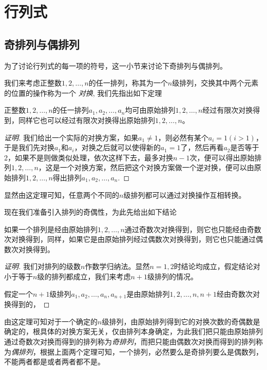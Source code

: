 
\section{行列式}
\label{sec:determinant}

\subsection{奇排列与偶排列}
\label{sec:odd-permutation-and-even-permutation}

为了讨论行列式的每一项的符号，这一小节来讨论下奇排列与偶排列。

我们来考虑正整数$1,2,\ldots,n$的任一排列，称其为一个$n$级排列，交换其中两个元素的位置的操作称为一个 \emph{对换}, 我们先指出如下定理
\begin{theorem}
  \label{theorem:all-rangement-can-be-producted-by-exchange}
  正整数$1,2,\ldots,n$的任一排列$a_1,a_2,\ldots,a_n$均可由原始排列$1,2,\ldots,n$经过有限次对换得到，同样它也可以经过有限次对换得出原始排列$1,2,\ldots,n$。
\end{theorem}

\begin{proof}[证明]
  我们给出一个实际的对换方案，如果$a_1 \neq 1$，则必然有某个$a_i=1(i>1)$，于是我们先对换$a_1$和$a_i$，对换之后就可以使得新的$a_1=1$了，然后再看$a_2$是否等于2，如果不是则做类似处理，依次这样下去，最多对换$n-1$次，便可以得出原始排列$1,2,\ldots,n$，这是一个对换方案，然后把这个对换方案做一个逆对换，便可以由原始排列$1,2,\ldots,n$得出排列$a_1,a_2,\ldots,a_n$.
\end{proof}

显然由这定理可知，任意两个不同的$n$级排列都可以通过对换操作互相转换。

现在我们准备引入排列的奇偶性，为此先给出如下结论
\begin{theorem}
  如果一个排列是经由原始排列$1,2,\ldots,n$通过奇数次对换得到，则它也只能经由奇数次对换得到，同样，如果它是由原始排列经过偶数次对换得到，则它也只能通过偶数次对换得到。
\end{theorem}

\begin{proof}[证明]
  我们对排列的级数$n$作数学归纳法。显然$n=1,2$时结论均成立，假定结论对小于等于$n$级的排列都成立，我们来考虑$n+1$级排列的情况。

  假定一个$n+1$级排列$a_1,a_2,\ldots,a_n,a_{n+1}$是由原始排列$1,2,\ldots,n,n+1$经由奇数次对换得到的，
\end{proof}

由这定理可知对于一个确定的$n$级排列，由原始排列得到它的对换次数的奇偶数是确定的，根具体的对换方案无关，仅由排列本身确定，为此我们把只能由原始排列通过奇数次对换而得到的排列称为\emph{奇排列}，而把只能由偶数次对换而得到的排列称为\emph{偶排列}，根据上面两个定理可知，一个排列，必然要么是奇排列要么是偶数列，不能两者都是或者两者都不是。

